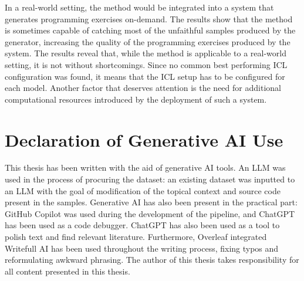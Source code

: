 \documentclass[english, 12pt, a4paper, sci, utf8, a-2b, online]{latex/definitions/aaltothesis}
\begin{document}
In a real-world setting, the method would be integrated into a system that generates programming exercises on-demand. The results show that the method is sometimes capable of catching most of the unfaithful samples produced by the generator, increasing the quality of the programming exercises produced by the system. The results reveal that, while the method is applicable to a real-world setting, it is not without shortcomings. Since no common best performing ICL configuration was found, it means that the ICL setup has to be configured for each model. Another factor that deserves attention is the need for additional computational resources introduced by the deployment of such a system.

\clearpage

\section{Declaration of Generative AI Use}

This thesis has been written with the aid of generative AI tools. An LLM was used in the process of procuring the dataset: an existing dataset was inputted to an LLM with the goal of modification of the topical context and source code present in the samples. Generative AI has also been present in the practical part: GitHub Copilot was used during the development of the pipeline, and ChatGPT has been used as a code debugger. ChatGPT has also been used as a tool to polish text and find relevant literature. Furthermore, Overleaf integrated Writefull AI has been used throughout the writing process, fixing typos and reformulating awkward phrasing. The author of this thesis takes responsibility for all content presented in this thesis.

\clearpage


\printbibliography[heading=bibintoc] %


\clearpage
\end{document}
